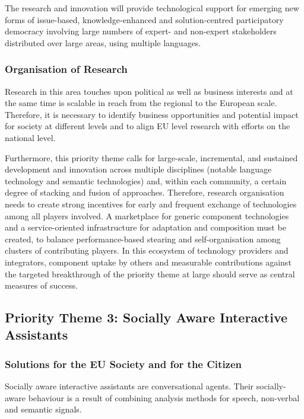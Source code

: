 \documentclass[10pt, plain]{../../metanetpaper}
\begin{document}
\begin{multicols}{2}
The research and innovation will provide technological support for emerging new forms of issue-based, knowledge-enhanced and solution-centred participatory democracy involving large numbers of expert- and non-expert stakeholders distributed over large areas, using multiple languages.

\subsubsection{Organisation of Research}
\label{sec:organ-rese-pt2}

Research in this area touches upon political as well as business interests and at the same time is scalable in reach from the regional to the European scale. Therefore, it is necessary to identify business opportunities and potential impact for society at different levels and to align EU level research with efforts on the national level.


Furthermore, this priority theme calls for large-scale, incremental, and sustained development and innovation across multiple disciplines (notable language technology and semantic technologies) and, within each community, a certain degree of stacking and fusion of approaches. Therefore, research organisation needs to create strong incentives for early and frequent exchange of technologies among all players involved. A marketplace for generic component technologies and a service-oriented infrastructure for adaptation and composition must be created, to balance performance-based stearing and self-organisation among clusters of contributing players. In this ecosystem of technology providers and integrators, component uptake by others and measurable contributions against the targeted breakthrough of the priority theme at large should serve as central measures of success.

\subsection{Priority Theme 3: Socially Aware Interactive Assistants}
\label{sec:priority-theme-3-interactive-assistant}

\subsubsection{Solutions for the EU Society and for the Citizen}
\label{sec:solutions-eu-society-pt3}

Socially aware interactive assistants are conversational agents. Their socially-aware behaviour is a result of combining analysis methods for speech, non-verbal and semantic signals.


\end{multicols}
\end{document}
